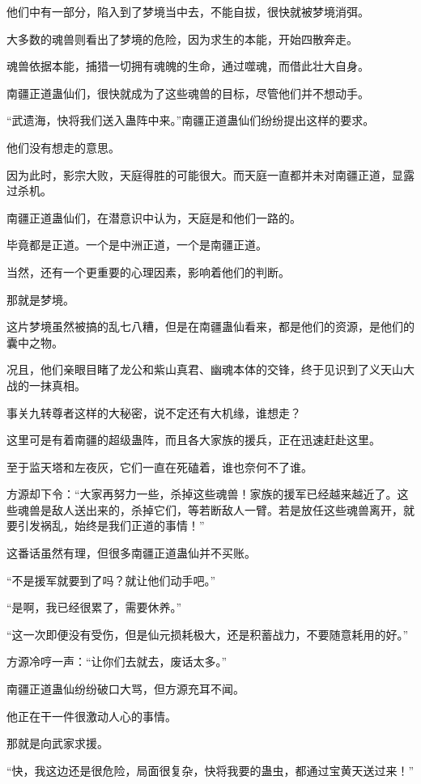 \begin{this_body}
他们中有一部分，陷入到了梦境当中去，不能自拔，很快就被梦境消弭。

大多数的魂兽则看出了梦境的危险，因为求生的本能，开始四散奔走。

魂兽依据本能，捕猎一切拥有魂魄的生命，通过噬魂，而借此壮大自身。

南疆正道蛊仙们，很快就成为了这些魂兽的目标，尽管他们并不想动手。

“武遗海，快将我们送入蛊阵中来。”南疆正道蛊仙们纷纷提出这样的要求。

他们没有想走的意思。

因为此时，影宗大败，天庭得胜的可能很大。而天庭一直都并未对南疆正道，显露过杀机。

南疆正道蛊仙们，在潜意识中认为，天庭是和他们一路的。

毕竟都是正道。一个是中洲正道，一个是南疆正道。

当然，还有一个更重要的心理因素，影响着他们的判断。

那就是梦境。

这片梦境虽然被搞的乱七八糟，但是在南疆蛊仙看来，都是他们的资源，是他们的囊中之物。

况且，他们亲眼目睹了龙公和紫山真君、幽魂本体的交锋，终于见识到了义天山大战的一抹真相。

事关九转尊者这样的大秘密，说不定还有大机缘，谁想走？

这里可是有着南疆的超级蛊阵，而且各大家族的援兵，正在迅速赶赴这里。

至于监天塔和左夜灰，它们一直在死磕着，谁也奈何不了谁。

方源却下令：“大家再努力一些，杀掉这些魂兽！家族的援军已经越来越近了。这些魂兽是敌人送出来的，杀掉它们，等若断敌人一臂。若是放任这些魂兽离开，就要引发祸乱，始终是我们正道的事情！”

这番话虽然有理，但很多南疆正道蛊仙并不买账。

“不是援军就要到了吗？就让他们动手吧。”

“是啊，我已经很累了，需要休养。”

“这一次即便没有受伤，但是仙元损耗极大，还是积蓄战力，不要随意耗用的好。”

方源冷哼一声：“让你们去就去，废话太多。”

南疆正道蛊仙纷纷破口大骂，但方源充耳不闻。

他正在干一件很激动人心的事情。

那就是向武家求援。

“快，我这边还是很危险，局面很复杂，快将我要的蛊虫，都通过宝黄天送过来！”


\end{this_body}

